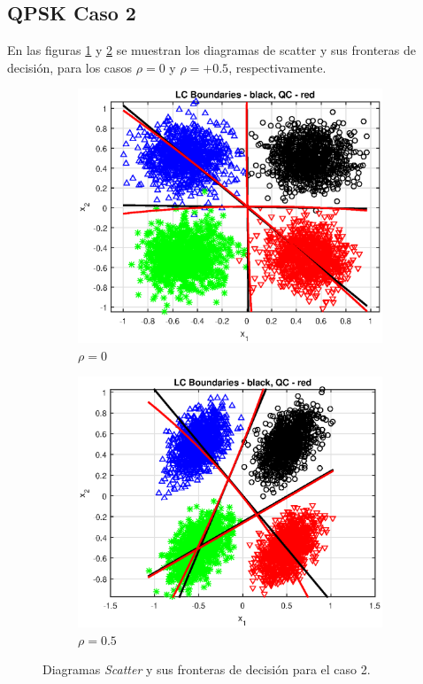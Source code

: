 \documentclass[11pt]{article} %
\begin{document}
\subsection[Caso 2]{QPSK Caso 2}

En las figuras \ref{fig:c2:ro00} y \ref{fig:c2:ro05} se muestran los diagramas de scatter y sus fronteras de decisión, para los casos $\rho = 0$ y $\rho = +0.5$, respectivamente.

\begin{figure}%
	\centering
	\begin{subfigure}[b]{0.475\textwidth}
		\centering
		\includegraphics[width=\textwidth]{../Part_2/ro00_scatter.eps}
		\caption[]{\small $\rho = 0$}
		\label{fig:c2:ro00}
	\end{subfigure}
	\quad
	\begin{subfigure}[b]{0.475\textwidth}
		\centering
		\includegraphics[width=\textwidth]{../Part_2/ro05_scatter.eps}
		\caption[]{\small $\rho = 0.5$} 
		\label{fig:c2:ro05}
	\end{subfigure}
	\label{fig:c2:scatter}
	\caption{Diagramas \emph{Scatter} y sus fronteras de decisión para el caso 2.}
\end{figure}
\end{document}
